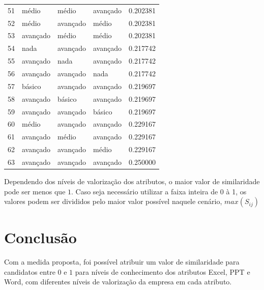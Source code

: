 \documentclass[]{article}
\begin{document}
\begin{longtable}{|llll|r|}
		51 & médio    & médio    & avançado & 0.202381     \\
		52 & médio    & avançado & médio    & 0.202381     \\
		53 & avançado & médio    & médio    & 0.202381     \\
		54 & nada      & avançado & avançado & 0.217742     \\
		55 & avançado & nada      & avançado & 0.217742     \\
		56 & avançado & avançado & nada      & 0.217742     \\
		57 & básico   & avançado & avançado & 0.219697     \\
		58 & avançado & básico   & avançado & 0.219697     \\
		59 & avançado & avançado & básico   & 0.219697     \\
		60 & médio    & avançado & avançado & 0.229167     \\
		61 & avançado & médio    & avançado & 0.229167     \\
		62 & avançado & avançado & médio    & 0.229167     \\
		63 & avançado & avançado & avançado & 0.250000     \\
		\hline
	\end{longtable}
	
	Dependendo dos níveis de valorização dos atributos, o maior valor de similaridade pode ser menos que $1$. Caso seja necessário utilizar a faixa inteira de 0 à 1, os valores podem ser divididos pelo maior valor possível naquele cenário, $max(S_{ij})$
	
	\section{Conclusão}
	
	Com a medida proposta, foi possível atribuir um valor de similaridade para candidatos entre $0$ e $1$ para níveis de conhecimento dos atributos Excel, PPT e Word, com diferentes níveis de valorização da empresa em cada atributo.
	
	
	\newpage	
\end{document}
